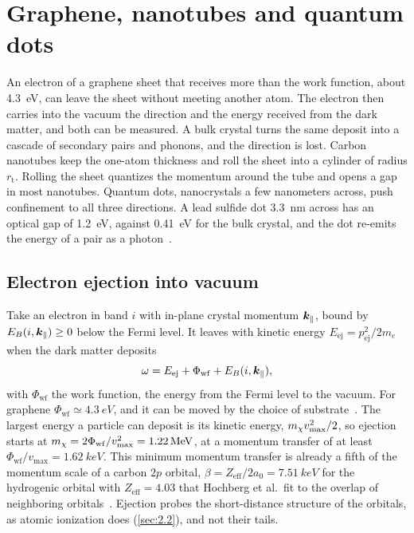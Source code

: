 \section{Graphene, nanotubes and quantum dots}\label{sec:16.3}

An electron of a graphene sheet that receives more than the work function, about \SI{4.3}{eV}, can leave the sheet without meeting another atom. The electron then carries into the vacuum the direction and the energy received from the dark matter, and both can be measured. A bulk crystal turns the same deposit into a cascade of secondary pairs and phonons, and the direction is lost. Carbon nanotubes keep the one-atom thickness and roll the sheet into a cylinder of radius $r_{\mathrm{t}}$. Rolling the sheet quantizes the momentum around the tube and opens a gap in most nanotubes. Quantum dots, nanocrystals a few nanometers across, push confinement to all three directions. A lead sulfide dot \SI{3.3}{nm} across has an optical gap of \SI{1.2}{eV}, against \SI{0.41}{eV} for the bulk crystal, and the dot re-emits the energy of a pair as a photon~\cite{blanco2023dark}.

\subsection{Electron ejection into vacuum}\label{sec:16.3-ejection}

Take an electron in band $i$ with in-plane crystal momentum $\bm{k}_\parallel$, bound by $E_B(i,\bm{k}_\parallel) \ge 0$ below the Fermi level. It leaves with kinetic energy $E_{\mathrm{ej}} = p_{\mathrm{ej}}^2/2m_e$ when the dark matter deposits
\begin{equation}
  \omega = E_{\mathrm{ej}} + \Phi_{\mathrm{wf}} + E_B(i,\bm{k}_\parallel) ,
  \label{eq:16.3-omega}
\end{equation}
with $\Phi_{\mathrm{wf}}$ the work function, the energy from the Fermi level to the vacuum. For graphene $\Phi_{\mathrm{wf}} \simeq \SI{4.3}{eV}$, and it can be moved by the choice of substrate~\cite[text after Eq.~(5) and footnote~2]{hochberg2017directional}. The largest energy a particle can deposit is its kinetic energy, $m_{\chi} v_{\mathrm{max}}^2/2$, so ejection starts at $m_{\chi} = 2\Phi_{\mathrm{wf}}/v_{\mathrm{max}}^2 = \SI{1.22}{MeV}$, at a momentum transfer of at least $\Phi_{\mathrm{wf}}/v_{\mathrm{max}} = \SI{1.62}{keV}$. This minimum momentum transfer is already a fifth of the momentum scale of a carbon $2p$ orbital, $\beta = Z_{\mathrm{eff}}/2a_0 = \SI{7.51}{keV}$ for the hydrogenic orbital with $Z_{\mathrm{eff}} = 4.03$ that Hochberg et al.\ fit to the overlap of neighboring orbitals~\cite[Eq.~(2)]{hochberg2017directional}. Ejection probes the short-distance structure of the orbitals, as atomic ionization does (\cref{sec:2.2}), and not their tails.

